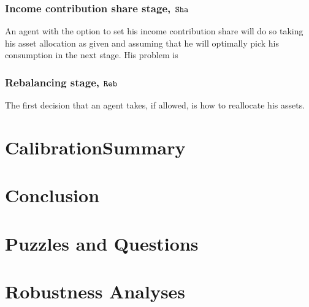 \documentclass[./RiskyContrib.tex]{subfiles}
\begin{document}
\subsubsection{Income contribution share stage, $\mathtt{Sha}$}

An agent with the option to set his income contribution share will do so
taking his asset allocation as given and assuming that he will optimally
pick his consumption in the next stage. His problem is
\begin{equation*}

\end{equation*}

\subsubsection{Rebalancing stage, $\mathtt{Reb}$}

The first decision that an agent takes, if allowed, is how to reallocate his
assets.
\begin{equation*}

\end{equation*}

\hypertarget{Calibration}{}
\section{Calibration\textemdash Summary}

\hypertarget{Conclusion}{}
\section{Conclusion}

\hypertarget{Puzzles-and-Questions}{}
\section{Puzzles and Questions}\label{sec:Puzzles}

\hypertarget{Robustness Analyses}{}
\section{Robustness Analyses}

\clearpage\vfill\eject

\onlyinsubfile{}
\end{document}
